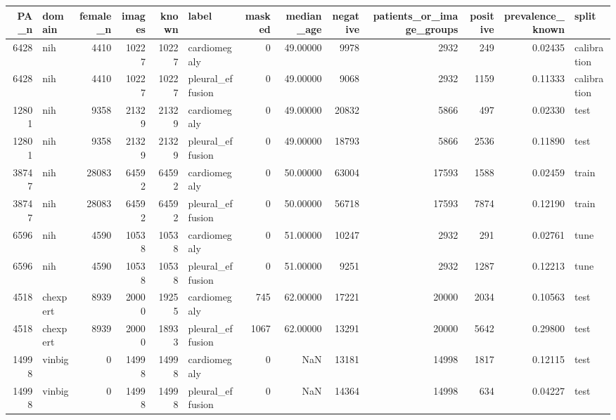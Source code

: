 \begin{tabular}{rlrrrlrrrrrrl}
\toprule
PA\_n & domain & female\_n & images & known & label & masked & median\_age & negative & patients\_or\_image\_groups & positive & prevalence\_known & split \\
\midrule
6428 & nih & 4410 & 10227 & 10227 & cardiomegaly & 0 & 49.00000 & 9978 & 2932 & 249 & 0.02435 & calibration \\
6428 & nih & 4410 & 10227 & 10227 & pleural\_effusion & 0 & 49.00000 & 9068 & 2932 & 1159 & 0.11333 & calibration \\
12801 & nih & 9358 & 21329 & 21329 & cardiomegaly & 0 & 49.00000 & 20832 & 5866 & 497 & 0.02330 & test \\
12801 & nih & 9358 & 21329 & 21329 & pleural\_effusion & 0 & 49.00000 & 18793 & 5866 & 2536 & 0.11890 & test \\
38747 & nih & 28083 & 64592 & 64592 & cardiomegaly & 0 & 50.00000 & 63004 & 17593 & 1588 & 0.02459 & train \\
38747 & nih & 28083 & 64592 & 64592 & pleural\_effusion & 0 & 50.00000 & 56718 & 17593 & 7874 & 0.12190 & train \\
6596 & nih & 4590 & 10538 & 10538 & cardiomegaly & 0 & 51.00000 & 10247 & 2932 & 291 & 0.02761 & tune \\
6596 & nih & 4590 & 10538 & 10538 & pleural\_effusion & 0 & 51.00000 & 9251 & 2932 & 1287 & 0.12213 & tune \\
4518 & chexpert & 8939 & 20000 & 19255 & cardiomegaly & 745 & 62.00000 & 17221 & 20000 & 2034 & 0.10563 & test \\
4518 & chexpert & 8939 & 20000 & 18933 & pleural\_effusion & 1067 & 62.00000 & 13291 & 20000 & 5642 & 0.29800 & test \\
14998 & vinbig & 0 & 14998 & 14998 & cardiomegaly & 0 & NaN & 13181 & 14998 & 1817 & 0.12115 & test \\
14998 & vinbig & 0 & 14998 & 14998 & pleural\_effusion & 0 & NaN & 14364 & 14998 & 634 & 0.04227 & test \\
\bottomrule
\end{tabular}
